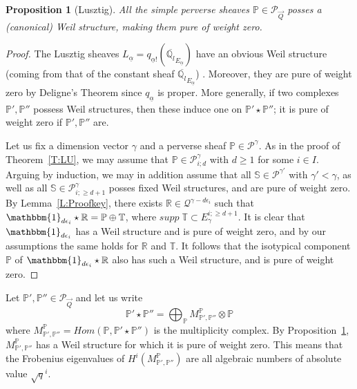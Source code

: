 \documentclass[a4paper,10pt]{amsart}
\def\a{\alpha}
\def\qlb{\overline{\mathbb{Q}_l}}
\def\PQ{\mathcal{P}_{\vec{Q}}}
\newtheorem{prop}[theo]{Proposition}
\numberwithin{equation}{section}
\begin{document}
\begin{prop}[Lusztig]\label{P:Pure} All the simple perverse sheaves $\mathbb{P} \in \mathcal{P}_{\vec{Q}}$ posses a (canonical) Weil structure, making them pure of weight zero.
\end{prop}
\begin{proof} The Lusztig sheaves $L_{\underline{\a}}=q_{\underline{\a}!}(\qlb_{E_{\underline{\a}}})$ have an obvious Weil structure (coming from that of the constant sheaf $\qlb_{E_{\underline{\a}}}$) . Moreover, they are pure of weight zero by Deligne's Theorem since $q_{\underline{\a}}$ is proper. More generally, if two complexes $\mathbb{P}', \mathbb{P}''$ possess Weil structures, then these induce one on $\mathbb{P}' \star \mathbb{P}'' $; it is pure of weight zero if $\mathbb{P}', \mathbb{P}''$ are.

Let us fix a dimension vector $\gamma$ and a perverse sheaf $\mathbb{P} \in \mathcal{P}^{\gamma}$. As in the proof of Theorem~\ref{T:LU}, we may assume that $\mathbb{P} \in \mathcal{P}^{\gamma}_{i; d}$ with $d \geq 1$ for some $i \in I$. Arguing by induction, we may in addition assume that all $\mathbb{S} \in \mathcal{P}^{\gamma'}$ with $\gamma'<\gamma$, as well as all $\mathbb{S} \in \mathcal{P}^{\gamma}_{i; \geq d+1}$ posses fixed Weil structures, and are pure of weight zero. By Lemma~\ref{L:Proofkey}, there exists $\mathbb{R} \in \mathcal{Q}^{\gamma-d\epsilon_i}$ such that $\mathbbm{1}_{d\epsilon_i} \star \mathbb{R} = \mathbb{P} \oplus \mathbb{T}$, where $supp\;\mathbb{T} \subset E_{\gamma}^{i;\geq d+1}$. It is clear that $\mathbbm{1}_{d\epsilon_i}$ has a Weil structure and is pure of weight zero, and by our assumptions the same holds for $\mathbb{R}$ and $\mathbb{T}$. It follows that the isotypical component $\mathbb{P}$ of $\mathbbm{1}_{d\epsilon_i} \star \mathbb{R}$ also has such a Weil structure, and is pure of weight zero. \end{proof}

\vspace{.1in}

Let $\mathbb{P}',\mathbb{P}'' \in \PQ$ and let us write
$$ \mathbb{P}' \star \mathbb{P}''=\bigoplus_{\mathbb{P}} M_{\mathbb{P}', \mathbb{P}''}^{\mathbb{P}} \otimes \mathbb{P}$$
where $M_{\mathbb{P}', \mathbb{P}''}^{\mathbb{P}}= Hom(\mathbb{P} ,\mathbb{P}' \star \mathbb{P}'')$ is the multiplicity complex. By Proposition~\ref{P:Pure}, $M_{\mathbb{P}', \mathbb{P}''}^{\mathbb{P}}$ has a Weil structure for which it is pure of weight zero. This means that the Frobenius eigenvalues of $H^i(M_{\mathbb{P}', \mathbb{P}''}^{\mathbb{P}})$ are all algebraic numbers of absolute value $\sqrt{q}^{i}$.
\end{document}

